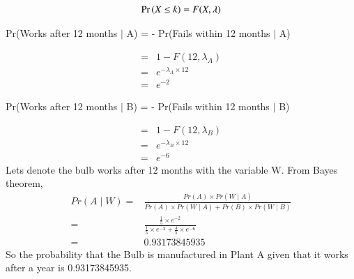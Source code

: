 \documentclass[journal,12pt,twocolumn]{IEEEtran}
\begin{document}
\begin{align}
    \Pr\left(X\leq k\right) = F(X,\lambda)
\end{align}
\begin{center}
    Pr(Works after 12 months $\mid$ A) =  - Pr(Fails within 12 months $\mid$ A)\\
\end{center}
\begin{align}
    =& 1 - F(12,\lambda_A)\\
    =& {e}^{\displaystyle - \lambda_A \times 12}\\
    =& {e}^{-2}
\end{align}
\begin{center}
    Pr(Works after 12 months $\mid$ B) =  - Pr(Fails within 12 months $\mid$ B)
\end{center}
\begin{align}
    =& 1 - F(12,\lambda_B)\\
    =& {e}^{\displaystyle -\lambda_B \times 12}\\
    =& {e}^{-6}
\end{align}
Lets denote the bulb works after 12 months with the variable W. From Bayes theorem,\\
\begin{align}
    Pr(A \mid W) = & \displaystyle{\frac{Pr(A) \times Pr(W \mid A)}{Pr(A) \times Pr(W \mid A) + Pr(B) \times Pr(W \mid B)}}\\
    = & \displaystyle{\frac{ \displaystyle{\frac{1}{5}} \times {e}^{-2}}{\displaystyle{\frac{1}{5}} \times {e}^{-2} + \displaystyle{\frac{4}{5}} \times {e}^{-6}}}\\[0.5cm]
    = & 0.93173845935
\end{align}
So the probability that the Bulb is manufactured in Plant A given that it works after a year is 0.93173845935.
\pagebreak
\end{document}
